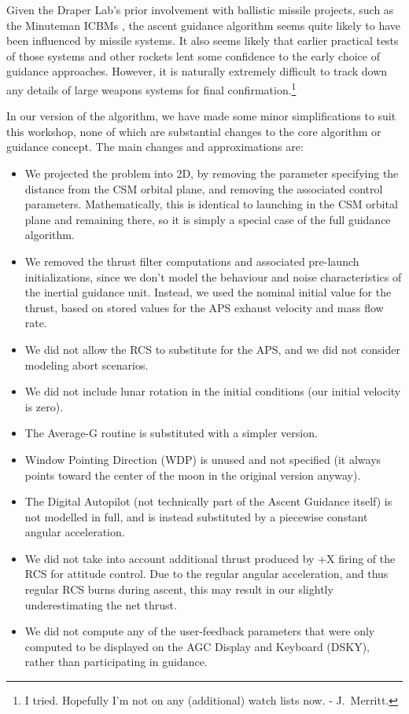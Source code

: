 \documentclass[12pt,openany]{book}
\begin{document}
Given the Draper Lab's prior involvement with ballistic missile projects, such as the Minuteman ICBMs \cite{dennis2018}, the ascent guidance algorithm seems quite likely to have been influenced by missile systems. It also seems likely that earlier practical tests of those systems and other rockets lent some confidence to the early choice of guidance approaches. However, it is naturally extremely difficult to track down any details of large weapons systems for final confirmation.\footnote{I tried. Hopefully I'm not on any (additional) watch lists now. - J.~Merritt.}

In our version of the algorithm, we have made some minor simplifications to suit this workshop, none of which are substantial changes to the core algorithm or guidance concept. The main changes and approximations are:
\begin{itemize}
\item We projected the problem into 2D, by removing the parameter specifying the distance from the CSM orbital plane, and removing the associated control parameters. Mathematically, this is identical to launching in the CSM orbital plane and remaining there, so it is simply a special case of the full guidance algorithm.
\item We removed the thrust filter computations and associated pre-launch initializations, since we don't model the behaviour and noise characteristics of the inertial guidance unit. Instead, we used the nominal initial value for the thrust, based on stored values for the APS exhaust velocity and mass flow rate.
\item We did not allow the RCS to substitute for the APS, and we did not consider modeling abort scenarios.
\item We did not include lunar rotation in the initial conditions (our initial velocity is zero).
\item The Average-G routine is substituted with a simpler version.
\item Window Pointing Direction (WDP) is unused and not specified (it always points toward the center of the moon in the original version anyway).
\item The Digital Autopilot (not technically part of the Ascent Guidance itself) is not modelled in full, and is instead substituted by a piecewise constant angular acceleration.
\item We did not take into account additional thrust produced by +X firing of the RCS for attitude control. Due to the regular angular acceleration, and thus regular RCS burns during ascent, this may result in our slightly underestimating the net thrust.
\item We did not compute any of the user-feedback parameters that were only computed to be displayed on the AGC Display and Keyboard (DSKY), rather than participating in guidance.
\end{itemize}
\end{document}
